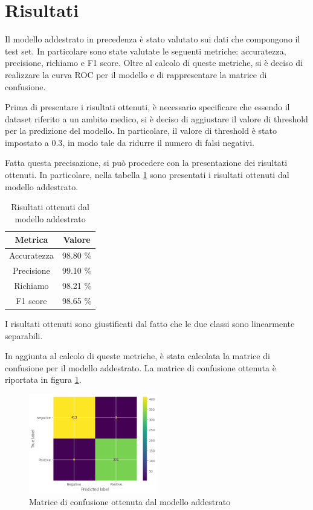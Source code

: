 \section{Risultati}
Il modello addestrato in precedenza è stato valutato sui dati che compongono il
test set. In particolare sono state valutate le seguenti metriche: accuratezza,
precisione, richiamo e F1 score. Oltre al calcolo di queste metriche, si è
deciso di realizzare la curva ROC per il modello e di rappresentare la matrice
di confusione.

Prima di presentare i risultati ottenuti, è necessario specificare che essendo
il dataset riferito a un ambito medico, si è deciso di aggiustare il valore di
threshold per la predizione del modello. In particolare, il valore di threshold
è stato impostato a $0.3$, in modo tale da ridurre il numero di falsi negativi.

Fatta questa precisazione, si può procedere con la presentazione dei risultati
ottenuti. In particolare, nella tabella \ref{tab:risultatiReteNeurale} sono
presentati i risultati ottenuti dal modello addestrato.

\begin{table}[ht]
    \centering
    \begin{tabular}{|c|c|}
        \hline
        \textbf{Metrica} & \textbf{Valore} \\
        \hline
        Accuratezza      & 98.80 \%        \\
        \hline
        Precisione       & 99.10 \%        \\
        \hline
        Richiamo         & 98.21 \%        \\
        \hline
        F1 score         & 98.65 \%        \\
        \hline
    \end{tabular}
    \caption{Risultati ottenuti dal modello addestrato}
    \label{tab:risultatiReteNeurale}
\end{table}

I risultati ottenuti sono giustificati dal fatto che le due classi sono linearmente
separabili.

In aggiunta al calcolo di queste metriche, è stata calcolata la matrice di confusione
per il modello addestrato. La matrice di confusione ottenuta è riportata in figura
\ref{fig:matriceConfusioneReteNeurale}.

\begin{figure}[!ht]
    \centering
    \includegraphics[width=0.5\textwidth]{img/rete/matrice_confusione.png}
    \caption{Matrice di confusione ottenuta dal modello addestrato}
    \label{fig:matriceConfusioneReteNeurale}
\end{figure}

